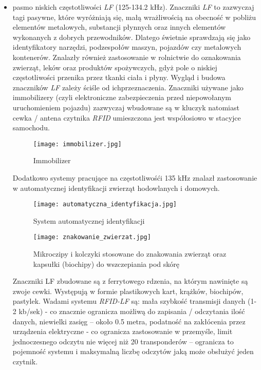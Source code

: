\begin{itemize}\setlength{\itemsep}{0pt}
	\item pasmo niskich częstotliwości \emph {LF} (125-134.2 kHz).
Znaczniki \emph{LF} to zazwyczaj tagi pasywne, które wyróżniają się, małą wrażliwością na obecność w pobliżu elementów metalowych, substancji płynnych oraz innych elementów wykonanych z dobrych przewodników. Dlatego świetnie sprawdzają się jako identyfikatory narzędzi, podzespołów maszyn, pojazdów czy metalowych kontenerów. Znalazły również zastosowanie w rolnictwie do oznakowania zwierząt, leków oraz produktów spożywczych, gdyż pole o niskiej częstotliwości przenika przez tkanki ciała i płyny.
Wygląd i budowa znaczników \emph{LF} zależy ściśle od ichprzeznaczenia. Znaczniki używane jako immobilizery (czyli elektroniczne zabezpieczenia przed niepowołanym uruchomieniem pojazdu) zazwyczaj wbudowane są w kluczyk natomiast cewka /  antena czytnika \emph{RFID} umieszczona jest współosiowo w stacyjce samochodu.
   
	\begin{figure}[h!]
	\centering
	    \texttt{[image: immobilizer.jpg]}
	    \caption{Immobilizer}
	\end{figure}

	Dodatkowo systemy pracujące na częstotliwośći 135 kHz znalazł zastosowanie w automatycznej identyfikacji zwierząt hodowlanych i domowych.

	\begin{figure}[h!]
	\centering
	    \texttt{[image: automatyczna\_identyfikacja.jpg]}
	    \caption{System automatycznej identyfikacji}
	\end{figure}
	
	\begin{figure}[h!]
	\centering
	    \texttt{[image: znakowanie\_zwierzat.jpg]}
	    \caption{Mikroczipy i kolczyki stosowane do znakowania zwierząt oraz kapsułki (biochipy) do wszczepiania pod skórę}
	\end{figure}
	
	Znaczniki LF zbudowane są z ferrytowego rdzenia, na którym nawinięte są zwoje cewki. Występują w formie plastikowych kart, krążków, biochipów, pastylek. Wadami systemu \emph{RFID-LF} są: mała szybkość transmisji danych (1-2 kb/sek) - co znacznie ogranicza możliwą do zapisania / odczytania ilość danych, niewielki zasięg – około 0.5 metra, podatność na zakłócenia przez urządzenia elektryczne - co ogranicza zastosowanie w przemyśle, limit jednoczesnego odczytu nie więcej niż 20 transponderów – ogranicza to pojemność systemu i maksymalną liczbę odczytów jaką może obsłużyć jeden czytnik. 


\end{itemize}
